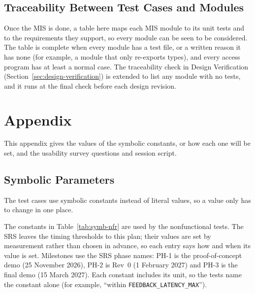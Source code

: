 \documentclass[12pt, titlepage]{article}
\begin{document}
\subsection{Traceability Between Test Cases and Modules}

Once the MIS is done, a table here maps each MIS module to its unit tests and
to the requirements they support, so every module can be seen to be
considered. The table is complete when every module has a test file, or a
written reason it has none (for example, a module that only re-exports
types), and every access program has at least a normal case. The
traceability check in Design Verification (Section~\ref{sec:design-verification})
is extended to list any module with no tests, and it runs at the final check
before each design revision.





\newpage

\section{Appendix}

This appendix gives the values of the symbolic constants, or how each one will
be set, and the usability survey questions and session script.

\subsection{Symbolic Parameters}
\label{sec:symbolic-parameters}

The test cases use symbolic constants instead of literal values, so a value
only has to change in one place.

The constants in Table~\ref{tab:symb-nfr} are used by the nonfunctional tests. The SRS leaves the
timing thresholds to this plan; their values are set by measurement rather
than chosen in advance, so each entry says how and when its value is set. Milestones use the SRS
phase names: PH-1 is the proof-of-concept demo (25 November 2026), PH-2 is
Rev~0 (1 February 2027) and PH-3 is the final demo (15 March 2027). Each
constant includes its unit, so the tests name the constant alone (for
example, ``within \texttt{FEEDBACK\_LATENCY\_MAX}'').
\end{document}
